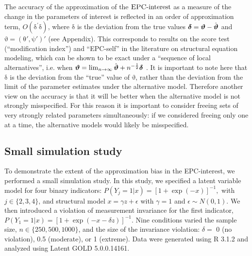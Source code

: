 \documentclass[letterpaper,12pt]{article}
\newcommand\vm[1]{%
\bm{\mathrm{#1}}}
\newcommand{\param}{\vm{\theta}}
\newcommand{\bpsi}{\vm{\psi}}
\newcommand{\da}{\textrm{{\sc {EPC}}-interest}}
\begin{document}
The accuracy of the approximation of the $\da{}$ as a measure of the change in the parameters of interest is reflected in an order of approximation term, $O(\vm{\delta}^\prime\vm{\delta})$, where $\vm{\delta}$ is the deviation from the true values  $\vm{\delta} = \vm{\vartheta} - \hat{\vm{\vartheta}}$ and $\vm{\vartheta} = (\param', \bpsi')'$ (see Appendix).  This  corresponds to results on the score test (``modification index'') and ``EPC-self'' in the literature on structural equation modeling, which can be shown to be exact under a ``sequence of local alternatives'', i.e. when $\vm{\vartheta} = \lim_{n\rightarrow\infty} \hat{\vm{\vartheta}} + n^{-\frac{1}{2}}\vm{\delta}$ \citep[p. 135]{satorra1989alternative}.
It is important to note here that $\vm{\delta}$ is the deviation from the ``true'' value of $\vm{\vartheta}$, rather than the deviation from the limit of the parameter estimates under the alternative model. Therefore another view on the accuracy is that it will be better when the alternative model is not strongly misspecified. For this reason it is important to consider freeing sets of very strongly related parameters simultaneously: if we considered freeing only one at a time, the alternative models would likely be misspecified.

\subsection{Small simulation study}
\label{sec:simulation}

To demonstrate the extent of the approximation bias in the EPC-interest, we performed a small simulation study. In this study, we specified a latent variable model for four binary indicators:
$
	P(Y_j = 1 | x) = [1 + \exp(-x)]^{-1},
$
with $j \in \{2,3,4\}$, and structural model
$
	x = \gamma z + \epsilon
$
with $\gamma = 1$ and $\epsilon \sim N(0, 1)$. We then introduced a violation of measurement invariance for the first indicator,
$
	P(Y_1 = 1 | x) = [1 + \exp(-x - \delta z)]^{-1}.
$
Nine conditions varied the sample size, $n \in \{250, 500, 1000\}$, and the size of the invariance violation:  $\delta = $ 0 (no violation), 0.5 (moderate), or 1 (extreme). 
Data were generated using R 3.1.2 and analyzed using Latent GOLD 5.0.0.14161. 
\end{document}
